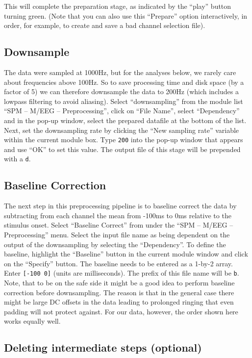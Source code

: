 This will complete the preparation stage, as indicated by the ``play'' button turning green. (Note that you can also use this ``Prepare'' option interactively, in order, for example, to create and save a bad channel selection file).

\subsection{Downsample}

The data were sampled at 1000Hz, but for the analyses below, we rarely care about frequencies above 100Hz. So to save processing time and disk space (by a factor of 5) we can therefore downsample the data to 200Hz (which includes a lowpass filtering to avoid aliasing). Select ``downsampling'' from the module list ``SPM -- M/EEG -- Preprocessing'', click on ``File Name'', select ``Dependency'' and in the pop-up window, select the prepared datafile at the bottom of the list. Next, set the downsampling rate by clicking the ``New sampling rate'' variable within the current module box. Type \texttt{200} into the pop-up window that appears and use ``OK'' to set this value. The output file of this stage will be prepended with a \texttt{d}. 

\subsection{Baseline Correction}

The next step in this preprocessing pipeline is to baseline correct the data by subtracting from each channel the mean from -100ms to 0ms relative to the stimulus onset. Select ``Baseline Correct'' from under the ``SPM -- M/EEG -- Preprocessing'' menu. Select the input file name as being dependent on the output of the downsampling by selecting the ``Dependency''. To define the baseline, highlight the ``Baseline'' button in the current module window and click on the ``Specify'' button. The baseline needs to be entered as a 1-by-2 array. Enter \texttt{[-100 0]} (units are milliseconds). The prefix of this file name will be \texttt{b}. Note, that to be on the safe side it might be a good idea to perform baseline correction before downsampling. The reason is that in the general case there might be large DC offsets in the data leading to prolonged ringing that even padding will not protect against. For our data, however, the order shown here works equally well.

\subsection{Deleting intermediate steps (optional)}

